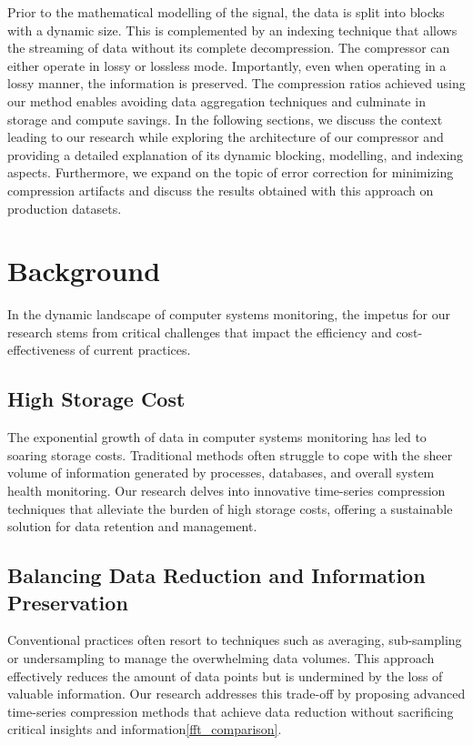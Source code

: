 \documentclass[conference]{IEEEtran}
\begin{document}
Prior to the mathematical modelling of the signal, the data is split into blocks with a dynamic size.
This is complemented by an indexing technique that allows the streaming of data without its complete decompression.
The compressor can either operate in lossy or lossless mode. Importantly, even when operating in a lossy manner, the information is preserved.
The compression ratios achieved using our method enables avoiding data aggregation techniques and culminate in storage and compute savings.
In the following sections, we discuss the context leading to our research while exploring the architecture of our compressor and providing a detailed explanation of its dynamic blocking, modelling, and indexing aspects. Furthermore, we expand on the topic of error correction for minimizing compression artifacts and discuss the results obtained with this approach on production datasets.

\section{Background}

In the dynamic landscape of computer systems monitoring, the impetus for our research stems from critical challenges that impact the efficiency and cost-effectiveness of current practices\cite{10.1007/978-3-319-63712-9_8}. 

\subsection{High Storage Cost}

The exponential growth of data in computer systems monitoring has led to soaring storage costs.
Traditional methods often struggle to cope with the sheer volume of information generated by processes, databases, and overall system health monitoring.
Our research delves into innovative time-series compression techniques that alleviate the burden of high storage costs, offering a sustainable solution for data retention and management. 

\subsection{Balancing Data Reduction and Information Preservation}
Conventional practices often resort to techniques such as averaging, sub-sampling or undersampling to manage the overwhelming data volumes. This approach effectively reduces the amount of data points but is undermined by the loss of valuable information.
Our research addresses this trade-off by proposing advanced time-series compression methods that achieve data reduction without sacrificing critical insights and information\ref{fft_comparison}. 
\end{document}
